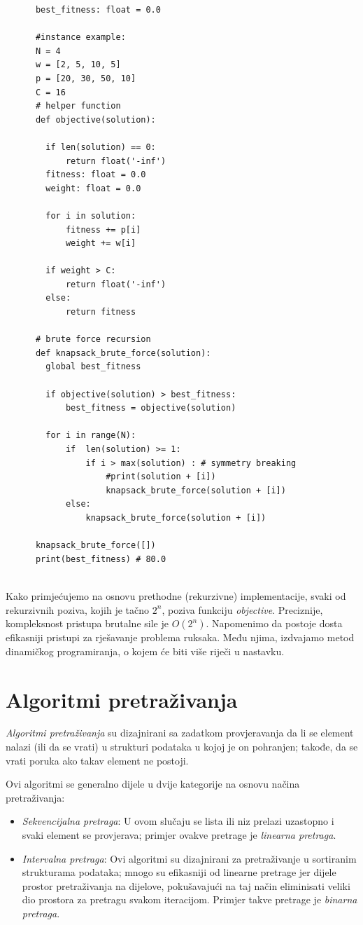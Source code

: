 \begin{verbatim}
	  best_fitness: float = 0.0
	  
	  #instance example:
	  N = 4
	  w = [2, 5, 10, 5]
	  p = [20, 30, 50, 10]
	  C = 16
	  # helper function
	  def objective(solution):
	  
	  	if len(solution) == 0: 
	  		return float('-inf')
	  	fitness: float = 0.0
	  	weight: float = 0.0
	  
	  	for i in solution: 
	  		fitness += p[i]
	  		weight += w[i]
	  
	  	if weight > C:
	  		return float('-inf')
	  	else:
	  		return fitness
	  
	  # brute force recursion
	  def knapsack_brute_force(solution): 
	  	global best_fitness
	  
	  	if objective(solution) > best_fitness:
	  		best_fitness = objective(solution) 
	  
	  	for i in range(N):
	  		if  len(solution) >= 1: 
	  			if i > max(solution) : # symmetry breaking 
	  				#print(solution + [i])
	  				knapsack_brute_force(solution + [i]) 
	  		else:
	  			knapsack_brute_force(solution + [i]) 
	  
	  knapsack_brute_force([])
	  print(best_fitness) # 80.0	
	  
\end{verbatim}


Kako primjećujemo na osnovu prethodne (rekurzivne) implementacije, svaki od  
rekurzivnih poziva, kojih je tačno $2^n$, poziva funkciju \textit{objective}. Preciznije, kompleksnost pristupa brutalne sile je $O(2^n)$. Napomenimo da postoje dosta efikasniji pristupi za rješavanje problema ruksaka. Među njima, izdvajamo metod dinamičkog programiranja, o kojem će biti više riječi u nastavku.


\section{Algoritmi pretraživanja}
\textit{Algoritmi pretraživanja} su dizajnirani sa zadatkom provjeravanja da li se element nalazi (ili da se vrati) u strukturi podataka u kojoj je on pohranjen; takođe,  da se vrati poruka ako takav element ne postoji.

Ovi algoritmi se generalno dijele u dvije kategorije na osnovu načina pretraživanja:

\begin{itemize}
	\item \textit{Sekvencijalna pretraga}: U ovom slučaju se lista ili niz prelazi uzastopno i svaki element se provjerava; primjer ovakve pretrage je \textit{linearna pretraga}.
	\item \textit{Intervalna pretraga}: Ovi algoritmi su   dizajnirani za pretraživanje u sortiranim strukturama podataka; mnogo su efikasniji od linearne pretrage jer dijele prostor pretraživanja na dijelove,  pokušavajući na taj način eliminisati veliki dio prostora za pretragu svakom iteracijom. Primjer takve pretrage je \textit{binarna pretraga}.
\end{itemize}

